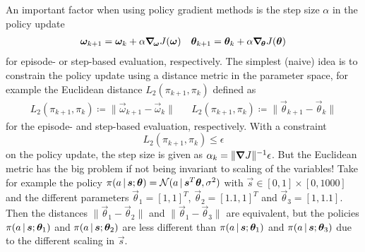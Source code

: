 			An important factor when using policy gradient methods is the step size \(\alpha\) in the policy update
			\begin{align*}
				\bm{\omega}_{k + 1} = \bm{\omega}_k + \alpha \grad_{\!\bm{\omega}} J(\bm{\omega})
				&&
				\bm{\theta}_{k + 1} = \bm{\theta}_k + \alpha \grad_{\!\bm{\theta}} J(\bm{\theta})
			\end{align*}
			for episode- or step-based evaluation, respectively. The simplest (naive) idea is to constrain the policy update using a distance metric in the parameter space, for example the Euclidean distance \( L_2(\pi_{k + 1}, \pi_k) \) defined as
			\begin{align*}
				L_2(\pi_{k + 1}, \pi_k) \coloneqq \lVert \vec{\omega}_{k + 1} - \vec{\omega}_k \rVert
				&&
				L_2(\pi_{k + 1}, \pi_k) \coloneqq \lVert \vec{\theta}_{k + 1} - \vec{\theta}_k \rVert
			\end{align*}
			for the episode- and step-based evaluation, respectively. With a constraint
			\begin{equation*}
				L_2(\pi_{k + 1}, \pi_k) \leq \epsilon
			\end{equation*}
			on the policy update, the step size is given as \( \alpha_k = \lVert \grad{J} \rVert^{-1} \epsilon \). But the Euclidean metric has the big problem if not being invariant to scaling of the variables! Take for example the policy \( \pi(a \,\vert\, \bm{s}; \bm{\theta}) = \mathcal{N}(a \,\vert\, \bm{s}^T \bm{\theta}, \sigma^2) \) with \( \vec{s} \in [0, 1] \times [0, 1000] \) and the different parameters \( \vec{\theta}_1 = [1, 1]^T \), \( \vec{\theta}_2 = [1.1, 1]^T \) and \( \vec{\theta}_3 = [1, 1.1] \). Then the distances \( \lVert \vec{\theta}_1 - \vec{\theta}_2 \rVert \) and \( \lVert \vec{\theta}_1 - \vec{\theta}_3 \rVert \) are equivalent, but the policies \( \pi(a \,\vert\, \bm{s}; \bm{\theta}_1) \) and \( \pi(a \,\vert\, \bm{s}; \bm{\theta}_2) \) are less different than \( \pi(a \,\vert\, \bm{s}; \bm{\theta}_1) \) and \( \pi(a \,\vert\, \bm{s}; \bm{\theta}_3) \) due to the different scaling in \(\vec{s}\).

